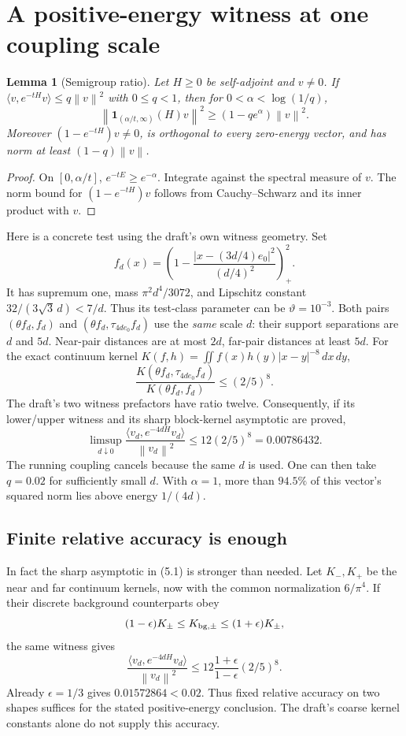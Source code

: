 \documentclass[11pt]{article}
\newtheorem{lemma}[proposition]{Lemma}
\theoremstyle{remark}
\newcommand{\norm}[1]{\left\|#1\right\|}
\begin{document}
\section{A positive-energy witness at one coupling scale}

\begin{lemma}[Semigroup ratio]
Let $H\geq0$ be self-adjoint and $v\ne0$. If
$\langle v,e^{-tH}v\rangle\leq q\norm v^2$ with $0\leq q<1$, then for
$0<\alpha<\log(1/q)$,
\[
\norm{\mathbf1_{(\alpha/t,\infty)}(H)v}^2
\geq(1-qe^\alpha)\norm v^2.
\]
Moreover $(1-e^{-tH})v\ne0$, is orthogonal to every zero-energy vector,
and has norm at least $(1-q)\norm v$.
\end{lemma}
\begin{proof}
On $[0,\alpha/t]$, $e^{-tE}\geq e^{-\alpha}$. Integrate against the
spectral measure of $v$. The norm bound for $(1-e^{-tH})v$ follows from
Cauchy--Schwarz and its inner product with $v$.
\end{proof}

Here is a concrete test using the draft's own witness geometry. Set
\[
f_d(x)=\left(1-\frac{|x-(3d/4)e_0|^2}{(d/4)^2}\right)_+^2.
\]
It has supremum one, mass $\pi^2d^4/3072$, and Lipschitz constant
$32/(3\sqrt3\,d)<7/d$. Thus its test-class parameter can be
$\vartheta=10^{-3}$. Both pairs
$(\theta f_d,f_d)$ and $(\theta f_d,\tau_{4de_0}f_d)$ use the
\emph{same} scale $d$: their support separations are $d$ and $5d$.
Near-pair distances are at most $2d$, far-pair distances at least $5d$.
For the exact continuum kernel
$K(f,h)=\iint f(x)h(y)|x-y|^{-8}\,dx\,dy$,
\[
\frac{K(\theta f_d,\tau_{4de_0}f_d)}
 {K(\theta f_d,f_d)}
\leq(2/5)^8.
\]
The draft's two witness prefactors have ratio twelve. Consequently, if
its lower/upper witness and its sharp block-kernel asymptotic are proved,
\[
\limsup_{d\downarrow0}
\frac{\langle v_d,e^{-4dH}v_d\rangle}{\norm{v_d}^2}
\leq12(2/5)^8=0.00786432.
\tag{5.1}
\]
The running coupling cancels because the same $d$ is used.
One can then take $q=0.02$ for sufficiently small $d$.
With $\alpha=1$, more than $94.5\%$ of this vector's squared norm lies
above energy $1/(4d)$.

\subsection{Finite relative accuracy is enough}

In fact the sharp asymptotic in (5.1) is stronger than needed.
Let $K_-,K_+$ be the near and far continuum kernels, now with the common
normalization $6/\pi^4$. If their discrete background counterparts obey
\[
 (1-\epsilon)K_\pm\leq K_{{\rm bg},\pm}
             \leq(1+\epsilon)K_\pm,
\]
the same witness gives
\[
 \frac{\langle v_d,e^{-4dH}v_d\rangle}{\norm{v_d}^2}
 \leq12\frac{1+\epsilon}{1-\epsilon}(2/5)^8.
\]
Already $\epsilon=1/3$ gives $0.01572864<0.02$.
Thus fixed relative accuracy on two shapes suffices for the stated
positive-energy conclusion. The draft's coarse kernel constants alone
do not supply this accuracy.
\end{document}
